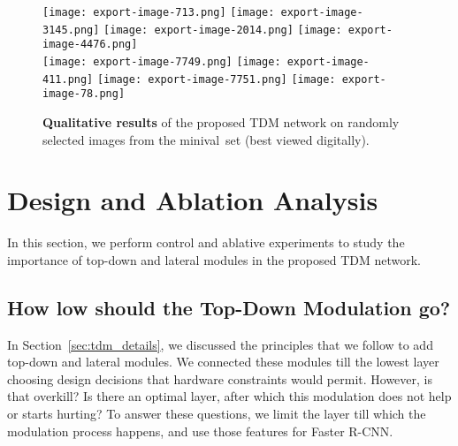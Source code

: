 \documentclass[10pt,twocolumn,letterpaper]{article}
\makeatletter
\newcommand{\minival}{minival\raisebox{0.2ex}{$\ast$}}
\def\maxwidth#1{\ifdim\Gin@nat@width>#1 #1\else\Gin@nat@width\fi}
\makeatother
\begin{document}
\begin{figure*}
\texttt{[image: export-image-713.png]}\hspace{0.1in}
\texttt{[image: export-image-3145.png]}\hspace{0.1in}
\texttt{[image: export-image-2014.png]}\hspace{0.1in}\vspace{0.1in}
\texttt{[image: export-image-4476.png]}\\
\texttt{[image: export-image-7749.png]}\hspace{0.1in}
\texttt{[image: export-image-411.png]}\hspace{0.1in}
\texttt{[image: export-image-7751.png]}\hspace{0.1in}\vspace{0.1in}
\texttt{[image: export-image-78.png]}
\caption[{\small Qualitative results of the TDM network.}]{\textbf{Qualitative results} of the proposed TDM network on randomly selected images from the \minival\ set (best viewed digitally).}
\label{fig:tdm_qual}
\vspace{-0.1in}
\end{figure*}




\section{Design and Ablation Analysis}\label{sec:analysis}
In this section, we perform control and ablative experiments to study the importance of top-down and lateral modules in the proposed TDM network.

\subsection{How low should the Top-Down Modulation go?}\label{sec:howlow}
In Section~\ref{sec:tdm_details}, we discussed the principles that we follow to add top-down and lateral modules. We connected these modules till the lowest layer choosing design decisions that hardware constraints would permit. However, is that overkill? Is there an optimal layer, after which this modulation does not help or starts hurting? To answer these questions, we limit the layer till which the modulation process happens, and use those features for Faster R-CNN.
\end{document}
